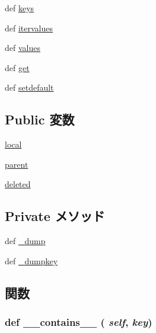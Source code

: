 \begin{DoxyCompactItemize}
\item 
def \hyperlink{classm5_1_1util_1_1multidict_1_1multidict_aeb7ba70a3c91eced4f8d49ac5dc0c398}{keys}
\item 
def \hyperlink{classm5_1_1util_1_1multidict_1_1multidict_aeb6e8630a10560ad0d4b34377c790f19}{itervalues}
\item 
def \hyperlink{classm5_1_1util_1_1multidict_1_1multidict_abb73a0060caeba53780d972f37623f1e}{values}
\item 
def \hyperlink{classm5_1_1util_1_1multidict_1_1multidict_a444a1328efb32d5d9d2dcb2efe855d3b}{get}
\item 
def \hyperlink{classm5_1_1util_1_1multidict_1_1multidict_a1af96fe42a8e8c54a0c606fb4f01df98}{setdefault}
\end{DoxyCompactItemize}
\subsection*{Public 変数}
\begin{DoxyCompactItemize}
\item 
\hyperlink{classm5_1_1util_1_1multidict_1_1multidict_a96db3da3652c2ce91fd6b07f397ab3f5}{local}
\item 
\hyperlink{classm5_1_1util_1_1multidict_1_1multidict_a457d913bff1ebc8671c1eca1c9d5fc03}{parent}
\item 
\hyperlink{classm5_1_1util_1_1multidict_1_1multidict_ae8bea206f083a3a4a81d81f601c577c0}{deleted}
\end{DoxyCompactItemize}
\subsection*{Private メソッド}
\begin{DoxyCompactItemize}
\item 
def \hyperlink{classm5_1_1util_1_1multidict_1_1multidict_aa00b91ba1bb41693f7b2e8cb357833a1}{\_\-dump}
\item 
def \hyperlink{classm5_1_1util_1_1multidict_1_1multidict_aa0d8800b51944333e7825901498117f6}{\_\-dumpkey}
\end{DoxyCompactItemize}


\subsection{関数}
\hypertarget{classm5_1_1util_1_1multidict_1_1multidict_a31ecdf34e79a47aea99a17eea32b7ac2}{
\subsubsection[{\_\-\_\-contains\_\-\_\-}]{\setlength{\rightskip}{0pt plus 5cm}def \_\-\_\-contains\_\-\_\- ( {\em self}, \/   {\em key})}}
\label{classm5_1_1util_1_1multidict_1_1multidict_a31ecdf34e79a47aea99a17eea32b7ac2}



